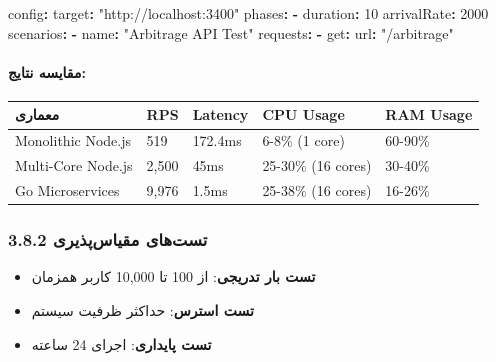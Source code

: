 \documentclass[
]{article}
\newenvironment{Shaded}{}{}
\newcommand{\AttributeTok}[1]{\textcolor[rgb]{0.49,0.56,0.16}{#1}}
\newcommand{\DecValTok}[1]{\textcolor[rgb]{0.25,0.63,0.44}{#1}}
\newcommand{\FunctionTok}[1]{\textcolor[rgb]{0.02,0.16,0.49}{#1}}
\newcommand{\KeywordTok}[1]{\textcolor[rgb]{0.00,0.44,0.13}{\textbf{#1}}}
\newcommand{\StringTok}[1]{\textcolor[rgb]{0.25,0.44,0.63}{#1}}
\newcounter{none} %
\providecommand{\tightlist}{%
  \setlength{\itemsep}{0pt}\setlength{\parskip}{0pt}}
\begin{document}
\begin{Shaded}
\begin{Highlighting}[]
\FunctionTok{config}\KeywordTok{:}
\AttributeTok{  }\FunctionTok{target}\KeywordTok{:}\AttributeTok{ }\StringTok{"http://localhost:3400"}
\AttributeTok{  }\FunctionTok{phases}\KeywordTok{:}
\AttributeTok{    }\KeywordTok{{-}}\AttributeTok{ }\FunctionTok{duration}\KeywordTok{:}\AttributeTok{ }\DecValTok{10}
\AttributeTok{      }\FunctionTok{arrivalRate}\KeywordTok{:}\AttributeTok{ }\DecValTok{2000}
\FunctionTok{scenarios}\KeywordTok{:}
\AttributeTok{  }\KeywordTok{{-}}\AttributeTok{ }\FunctionTok{name}\KeywordTok{:}\AttributeTok{ }\StringTok{"Arbitrage API Test"}
\AttributeTok{    }\FunctionTok{requests}\KeywordTok{:}
\AttributeTok{      }\KeywordTok{{-}}\AttributeTok{ }\FunctionTok{get}\KeywordTok{:}
\AttributeTok{          }\FunctionTok{url}\KeywordTok{:}\AttributeTok{ }\StringTok{"/arbitrage"}
\end{Highlighting}
\end{Shaded}

\paragraph{مقایسه
نتایج:}\label{ux645ux642ux627ux6ccux633ux647-ux646ux62aux627ux6ccux62c}

{\def\LTcaptype{none} %
\begin{longtable}[]{@{}lllll@{}}
\toprule\noalign{}
معماری & RPS & Latency & CPU Usage & RAM Usage \\
\midrule\noalign{}
\endhead
\bottomrule\noalign{}
\endlastfoot
Monolithic Node.js & 519 & 172.4ms & 6-8\% (1 core) & 60-90\% \\
Multi-Core Node.js & 2,500 & 45ms & 25-30\% (16 cores) & 30-40\% \\
Go Microservices & 9,976 & 1.5ms & 25-38\% (16 cores) & 16-26\% \\
\end{longtable}
}

\subsubsection{3.8.2 تست‌های
مقیاس‌پذیری}\label{ux62aux633ux62aux647ux627ux6cc-ux645ux642ux6ccux627ux633ux67eux630ux6ccux631ux6cc}

\begin{itemize}
\tightlist
\item
  \textbf{تست بار تدریجی}: از 100 تا 10,000 کاربر همزمان
\item
  \textbf{تست استرس}: حداکثر ظرفیت سیستم
\item
  \textbf{تست پایداری}: اجرای 24 ساعته
\end{itemize}
\end{document}
